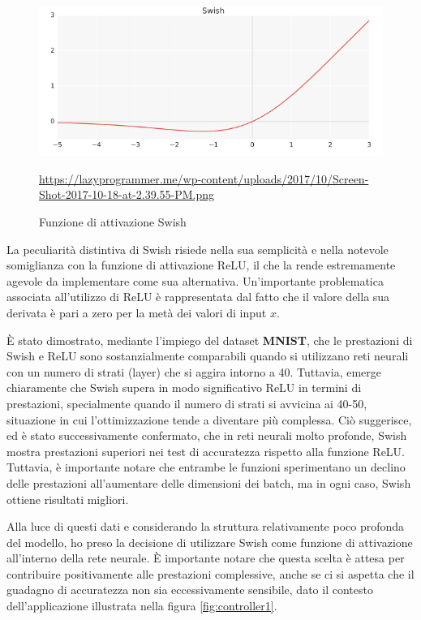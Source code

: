 \begin{figure}[H]
    \begin{center}
		\includegraphics[width=\textwidth]{img/Screen-Shot-2017-10-18-at-2.39.55-PM.png}
		\caption{Funzione di attivazione Swish}
		\url{https://lazyprogrammer.me/wp-content/uploads/2017/10/Screen-Shot-2017-10-18-at-2.39.55-PM.png}
		\label{fig:swish}	
	\end{center}
\end{figure}

La peculiarità distintiva di Swish risiede nella sua semplicità e 
nella notevole somiglianza con la funzione di attivazione ReLU, 
il che la rende estremamente agevole da implementare come sua alternativa. 
Un'importante problematica associata all'utilizzo di ReLU è 
rappresentata dal fatto che il valore della sua derivata è pari 
a zero per la metà dei valori di input $x$.

È stato dimostrato, mediante l'impiego del dataset \textbf{MNIST}, 
che le prestazioni di Swish e ReLU sono sostanzialmente comparabili 
quando si utilizzano reti neurali con un numero di strati (layer) 
che si aggira intorno a 40. Tuttavia, emerge chiaramente che Swish 
supera in modo significativo ReLU in termini di prestazioni, 
specialmente quando il numero di strati si avvicina ai 40-50, 
situazione in cui l'ottimizzazione tende a diventare più complessa. 
Ciò suggerisce, ed è stato successivamente confermato, che in reti 
neurali molto profonde, Swish mostra prestazioni superiori nei test 
di accuratezza rispetto alla funzione ReLU. Tuttavia, è importante 
notare che entrambe le funzioni sperimentano un declino delle 
prestazioni all'aumentare delle dimensioni dei batch, ma in ogni caso, 
Swish ottiene risultati migliori.

Alla luce di questi dati e considerando la struttura relativamente 
poco profonda del modello, ho preso la decisione di utilizzare 
Swish come funzione di attivazione all'interno della rete neurale. 
È importante notare che questa scelta è attesa per contribuire 
positivamente alle prestazioni complessive, anche se ci si aspetta 
che il guadagno di accuratezza non sia eccessivamente sensibile, 
dato il contesto dell'applicazione illustrata nella figura 
\ref{fig:controller1}.